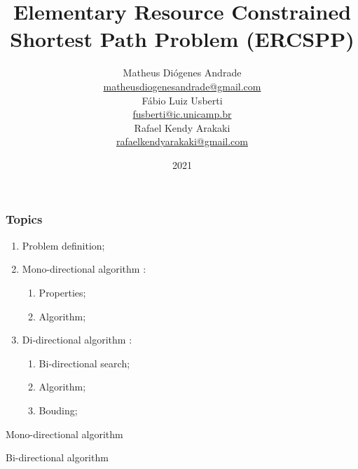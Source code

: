 \documentclass[notheorems]{beamer}
\title{Elementary Resource Constrained Shortest Path Problem (ERCSPP)}
\author{Matheus Diógenes Andrade\\
\href{mailto:matheusdiogenesandrade@gmail.com}{matheusdiogenesandrade@gmail.com}\\
Fábio Luiz Usberti\\
\href{mailto:fusberti@ic.unicamp.br}{fusberti@ic.unicamp.br}\\
Rafael Kendy Arakaki\\
\href{mailto:rafaelkendyarakaki@gmail.com}{rafaelkendyarakaki@gmail.com}
}
\institute{Institute of Computing - University of Campinas}
\date{2021}
\theoremstyle{definition}
\theoremstyle{example}
\theoremstyle{plain}
\begin{document}
\frame{\titlepage}

\begin{frame}
  \frametitle{Topics}
  \begin{enumerate}
    \item Problem definition;
    \item Mono-directional algorithm :
      \begin{enumerate}
        \item Properties;
        \item Algorithm;
      \end{enumerate}
    \item Di-directional algorithm :
      \begin{enumerate}
        \item Bi-directional search;
        \item Algorithm;
        \item Bouding;
      \end{enumerate}
  \end{enumerate}
\end{frame}



\begin{frame}
  \begin{center}
    \Huge Mono-directional algorithm 
  \end{center}
\end{frame}





\begin{frame}
  \begin{center}
    \Huge Bi-directional algorithm 
  \end{center}
\end{frame}



\begin{frame}
\printbibliography
\end{frame}
\end{document}
